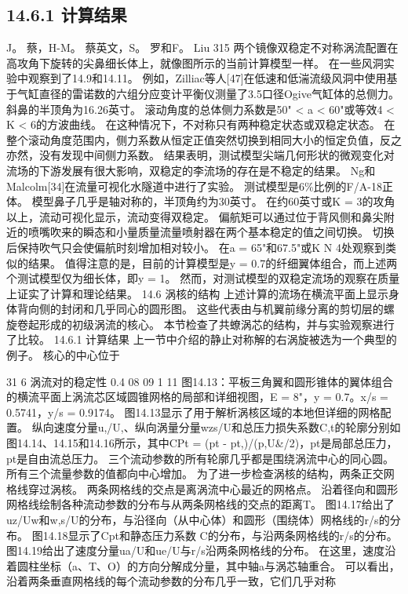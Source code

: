 \documentclass[UTF8,11pt,a4paper,openany,fontset=fandol]{ctexbook}
\begin{document}
\subsection{14.6.1 计算结果}
J。 蔡，H-M。 蔡英文，S。 罗和F。 Liu 315 两个镜像双稳定不对称涡流配置在高攻角下旋转的尖鼻细长体上，就像图所示的当前计算模型一样。 在一些风洞实验中观察到了14.9和14.11。 例如，Zilliac等人[47]在低速和低湍流级风洞中使用基于气缸直径的雷诺数的六组分应变计平衡仪测量了3.5口径Ogive气缸体的总侧力。 斜鼻的半顶角为16.26英寸。 滚动角度的总体侧力系数是50" < a < 60"或等效4 < K < 6的方波曲线。 在这种情况下，不对称只有两种稳定状态或双稳定状态。 在整个滚动角度范围内，侧力系数从恒定正值突然切换到相同大小的恒定负值，反之亦然，没有发现中间侧力系数。 结果表明，测试模型尖端几何形状的微观变化对流场的下游发展有很大影响，双稳定的李流场的存在是不稳定的结果。 Ng和Malcolm[34]在流量可视化水隧道中进行了实验。 测试模型是6\%比例的F/A-18正体。 模型鼻子几乎是轴对称的，半顶角约为30英寸。 在约60英寸或K = 3的攻角以上，流动可视化显示，流动变得双稳定。 偏航矩可以通过位于背风侧和鼻尖附近的喷嘴吹来的瞬态和小量质量流量喷射器在两个基本稳定的值之间切换。 切换后保持吹气只会使偏航时刻增加相对较小。 在a = 65"和67.5"或K N 4处观察到类似的结果。 值得注意的是，目前的计算模型是y = 0.7的纤细翼体组合，而上述两个测试模型仅为细长体，即y = 1。 然而，对测试模型的双稳定流场的观察在质量上证实了计算和理论结果。 14.6 涡核的结构 上述计算的流场在横流平面上显示身体背向侧的封闭和几乎同心的圆形图。 这些代表由与机翼前缘分离的剪切层的螺旋卷起形成的初级涡流的核心。 本节检查了共蟟涡芯的结构，并与实验观察进行了比较。 14.6.1 计算结果 上一节中介绍的静止对称解的右涡旋被选为一个典型的例子。 核心的中心位于

31 6 涡流对的稳定性 0.4 08 09 1 11 图14.13：平板三角翼和圆形锥体的翼体组合的横流平面上涡流芯区域圆锥网格的局部和详细视图，E = 8"，y = 0.7。x/s = 0.5741，y/s = 0.9174。 图14.13显示了用于解析涡核区域的本地但详细的网格配置。 纵向速度分量u,/U,、纵向涡量分量wzs/U和总压力损失系数C,t的轮廓分别如图14.14、14.15和14.16所示，其中CPt = (pt - pt,)/(p,U\&/2)，pt是局部总压力，pt是自由流总压力。 三个流动参数的所有轮廓几乎都是围绕涡流中心的同心圆。 所有三个流量参数的值都向中心增加。 为了进一步检查涡核的结构，两条正交网格线穿过涡核。 两条网格线的交点是离涡流中心最近的网格点。 沿着径向和圆形网格线绘制各种流动参数的分布与从两条网格线的交点的距离T。 图14.17给出了uz/Uw和w,s/U的分布，与沿径向（从中心体）和圆形（围绕体）网格线的r/s的分布。 图14.18显示了Cpt和静态压力系数 C的分布，与沿两条网格线的r/s的分布。 图14.19给出了速度分量ua/U和ue/U与r/s沿两条网格线的分布。 在这里，速度沿着圆柱坐标（a、T、O）的方向分解成分量，其中轴a与涡芯轴重合。 可以看出，沿着两条垂直网格线的每个流动参数的分布几乎一致，它们几乎对称
\end{document}
